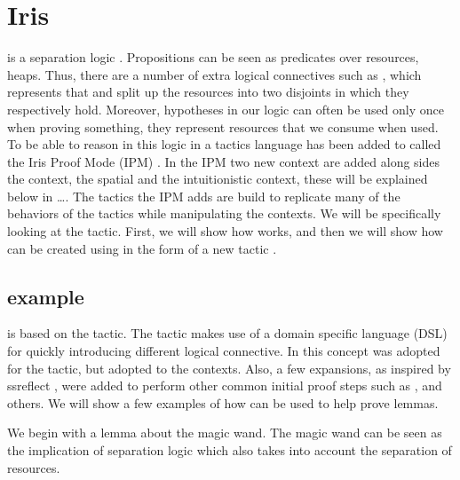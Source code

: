 \documentclass[thesis.tex]{subfiles}
\begin{document}
\section[Iris iIntros]{Iris }
\iris is a separation logic \cite*{jungIrisMonoidsInvariants2015a,jungHigherorderGhostState2016,krebbersEssenceHigherOrderConcurrent2017,jungIrisGroundModular2018}. Propositions can be seen as predicates over resources, \eg heaps. Thus, there are a number of extra logical connectives such as , which represents that  and  split up the resources into two disjoints in which they respectively hold. Moreover, hypotheses in our logic can often be used only once when proving something, they represent resources that we consume when used. To be able to reason in this logic in \coq a tactics language has been added to \coq called the Iris Proof Mode (IPM) \cite*{krebbersInteractiveProofsHigherorder2017,krebbersMoSeLGeneralExtensible2018}. In the IPM two new context are added along sides the \coq context, the spatial and the intuitionistic context, these will be explained below in \ldots.
The tactics the IPM adds are build to replicate many of the behaviors of the \coq tactics while manipulating the \iris contexts. We will be specifically looking at the  tactic. First, we will show how  works, and then we will show how  can be created using \elpi in the form of a new tactic .

\subsection[iIntros example]{ example}
 is based on the \coq {} tactic. The \coq {} tactic makes use of a domain specific language (DSL) for quickly introducing different logical connective. In \iris this concept was adopted for the  tactic, but adopted to the \iris contexts. Also, a few expansions, as inspired by ssreflect \cite*{huetCoqProofAssistant1997, gonthierSmallScaleReflection2016}, were added to perform other common initial proof steps such as ,  and others. We will show a few examples of how  can be used to help prove lemmas.

We begin with a lemma about the magic wand. The magic wand can be seen as the implication of separation logic which also takes into account the separation of resources.
\end{document}
